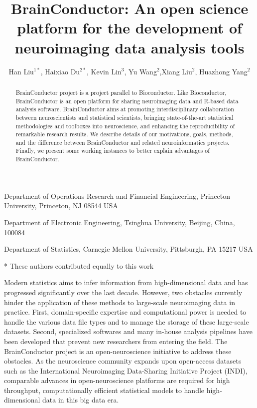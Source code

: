 \documentclass{nature}
\title{BrainConductor: An open science platform for the development of
neuroimaging
data analysis tools}
\author{Han Liu$^{1*}$, Haixiao Du$^{2*}$, Kevin Lin$^3$, Yu Wang$^2$,Xiang
Liu$^2$, Huazhong
Yang$^2$ {\color{red}}}
\begin{document}
\maketitle



\begin{affiliations}
\item Department of Operations Research and Financial Engineering, Princeton
University, Princeton, NJ 08544 USA
\item Department of Electronic Engineering, Tsinghua University, Beijing, China,
100084
\item Department of Statistics, Carnegie Mellon University,
Pittsburgh, PA 15217 USA
\item[*] These authors contributed equally to this work
\end{affiliations}

\begin{abstract}
    BrainConductor project is a project parallel to Bioconductor. Like
Bioconductor, BrainConductor is an open platform for sharing neuroimaging data
and R-based data analysis software. BrainConductor aims at promoting
interdisciplinary collaboration between neuroscientists and
statistical scientists, bringing state-of-the-art statistical methodologies and
toolboxes into neuroscience, and enhancing the reproducibility of remarkable
research results. We describe details of our motivations, goals, methods, and
the difference between BrainConductor and related neuroinformatics projects.
Finally, we present some working instances to better explain advantages of
BrainConductor.
\end{abstract}


Modern statistics aims to infer information from high-dimensional data
and has progressed significantly over the last decade.
However, two obstacles currently hinder the
application of these methods to large-scale neuroimaging data 
in practice. 
First, domain-specific expertise and computational power is needed to handle
the various data file types and to manage the storage
of these large-scale datasets. Second, specialized softwares and
many in-house analysis pipelines have been developed that 
prevent new researchers from entering the field.
The BrainConductor project is an open-neuroscience
initiative to address
these obstacles.
As the neuroscience community expands upon open-access
datasets such as the  International Neuroimaging Data-Sharing
Initiative Project (INDI), comparable advances in 
open-neuroscience platforms are required
for high
throughput, computationally efficient statistical models
to handle high-dimensional data in this big data era. 
\end{document}
